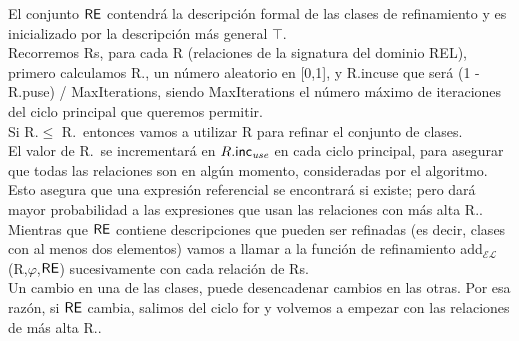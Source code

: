 

El conjunto $\textsf{RE}$ contendr\'a la descripci\'on formal de las clases de refinamiento
y es inicializado por la descripci\'on m\'as general $\top$.\\

Recorremos Rs, para cada R (relaciones de la signatura del dominio REL), primero calculamos R.\randomuse, un n\'umero aleatorio en [0,1], y R.incuse que ser\'a (1 -R.puse) / MaxIterations, siendo MaxIterations el n\'umero m\'aximo de iteraciones del ciclo principal que queremos permitir.\\

Si R.\randomuse $\le$ R.\puse\ entonces vamos a utilizar R para refinar el conjunto de
clases. \\

El valor de R.\puse\ se incrementar\'a en $R.\textsf{inc}_\emph{use}$
en cada ciclo principal, para asegurar que todas las relaciones son en alg\'un momento,
consideradas por el algoritmo. Esto asegura que una expresi\'on referencial
se encontrar\'a si existe; pero dar\'a mayor probabilidad a las expresiones
que usan las relaciones con m\'as alta R.\puse.\\
 
Mientras que $\textsf{RE}$ contiene descripciones que pueden ser refinadas (es decir, clases
con al menos dos elementos) vamos a llamar a la funci\'on de refinamiento
add$_\mathcal{EL}$(R,$\varphi$,$\textsf{RE}$) sucesivamente con cada relaci\'on
de Rs.\\

 Un cambio en una de las clases, puede desencadenar cambios en
las otras. Por esa raz\'on, si $\textsf{RE}$ cambia, salimos del ciclo for y volvemos a
empezar con las relaciones de m\'as alta R.\puse. \\

